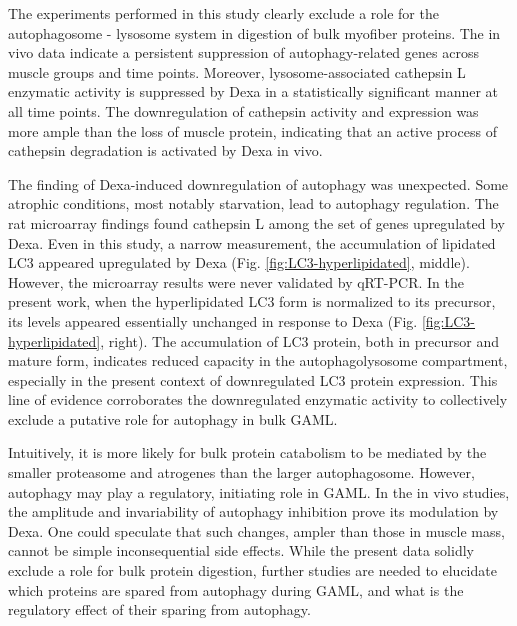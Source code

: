 \documentclass[12pt,english]{report}\usepackage[]{graphicx}\usepackage[]{color}
\begin{document}
The experiments performed in this study clearly exclude a role for
the autophagosome - lysosome system in digestion of bulk myofiber
proteins. The in vivo data indicate a persistent suppression of autophagy-related
genes across muscle groups and time points. Moreover, lysosome-associated
cathepsin L enzymatic activity is suppressed by Dexa in a statistically
significant manner at all time points. The downregulation of cathepsin
activity and expression was more ample than the loss of muscle protein,
indicating that an active process of cathepsin degradation is activated
by Dexa in vivo. 

The finding of Dexa-induced downregulation of autophagy was unexpected.
Some atrophic conditions, most notably starvation, lead to autophagy
regulation. The rat microarray findings found cathepsin L among the
set of genes upregulated by Dexa. Even in this study, a narrow measurement,
the accumulation of lipidated LC3 appeared upregulated by Dexa (Fig.
\ref{fig:LC3-hyperlipidated}, middle). However, the microarray results
were never validated by qRT-PCR. In the present work, when the hyperlipidated
LC3 form is normalized to its precursor, its levels appeared essentially
unchanged in response to Dexa (Fig. \ref{fig:LC3-hyperlipidated},
right). The accumulation of LC3 protein, both in precursor and mature
form, indicates reduced capacity in the autophagolysosome compartment,
especially in the present context of downregulated LC3 protein expression.
This line of evidence corroborates the downregulated enzymatic activity
to collectively exclude a putative role for autophagy in bulk GAML.

Intuitively, it is more likely for bulk protein catabolism to be mediated
by the smaller proteasome and atrogenes than the larger autophagosome.
However, autophagy may play a regulatory, initiating role in GAML.
In the in vivo studies, the amplitude and invariability of autophagy
inhibition prove its modulation by Dexa. One could speculate that
such changes, ampler than those in muscle mass, cannot be simple inconsequential
side effects. While the present data solidly exclude a role for bulk
protein digestion, further studies are needed to elucidate which proteins
are spared from autophagy during GAML, and what is the regulatory
effect of their sparing from autophagy.
\end{document}
